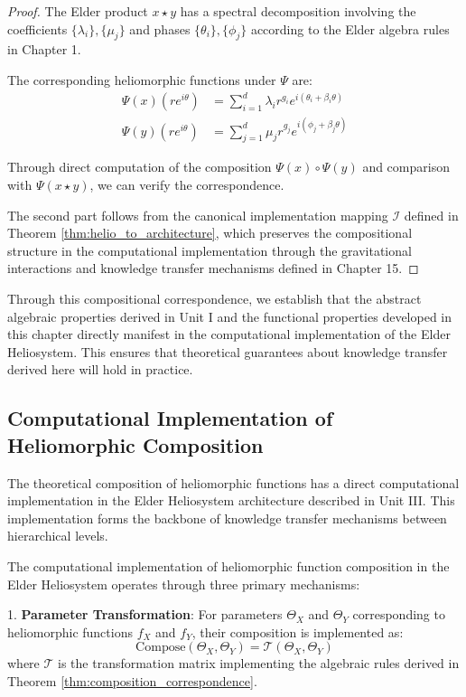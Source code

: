 \begin{definition}
\begin{enumerate}
\begin{proof}
The Elder product $x \star y$ has a spectral decomposition involving the coefficients $\{\lambda_i\}, \{\mu_j\}$ and phases $\{\theta_i\}, \{\phi_j\}$ according to the Elder algebra rules in Chapter 1.

The corresponding heliomorphic functions under $\Psi$ are:
\begin{align}
\Psi(x)(re^{i\theta}) &= \sum_{i=1}^{d} \lambda_i r^{g_i} e^{i(\theta_i + \beta_i \theta)}\\
\Psi(y)(re^{i\theta}) &= \sum_{j=1}^{d} \mu_j r^{g_j} e^{i(\phi_j + \beta_j \theta)}
\end{align}

Through direct computation of the composition $\Psi(x) \circ \Psi(y)$ and comparison with $\Psi(x \star y)$, we can verify the correspondence.

The second part follows from the canonical implementation mapping $\mathcal{I}$ defined in Theorem \ref{thm:helio_to_architecture}, which preserves the compositional structure in the computational implementation through the gravitational interactions and knowledge transfer mechanisms defined in Chapter 15.
\end{proof}

Through this compositional correspondence, we establish that the abstract algebraic properties derived in Unit I and the functional properties developed in this chapter directly manifest in the computational implementation of the Elder Heliosystem. This ensures that theoretical guarantees about knowledge transfer derived here will hold in practice.

\subsection{Computational Implementation of Heliomorphic Composition}

The theoretical composition of heliomorphic functions has a direct computational implementation in the Elder Heliosystem architecture described in Unit III. This implementation forms the backbone of knowledge transfer mechanisms between hierarchical levels.

\begin{definition}
\label{def:computational_composition}
The computational implementation of heliomorphic function composition in the Elder Heliosystem operates through three primary mechanisms:

1. \textbf{Parameter Transformation}: For parameters $\Theta_X$ and $\Theta_Y$ corresponding to heliomorphic functions $f_X$ and $f_Y$, their composition is implemented as:
\begin{equation}
\text{Compose}(\Theta_X, \Theta_Y) = \mathcal{T}(\Theta_X, \Theta_Y)
\end{equation}
where $\mathcal{T}$ is the transformation matrix implementing the algebraic rules derived in Theorem \ref{thm:composition_correspondence}.


\end{definition}
\end{enumerate}
\end{definition}
